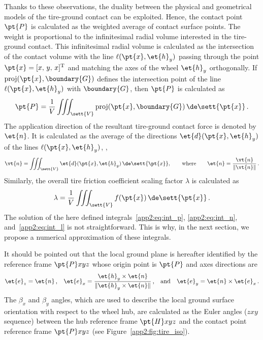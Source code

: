 Thanks to these observations, the duality between the physical and geometrical models of the tire-ground contact can be exploited. Hence, the contact point $\pt{P}$ is calculated as the weighted average of contact surface points. The weight is proportional to the infinitesimal radial volume interested in the tire-ground contact. This infinitesimal radial volume is calculated as the intersection of the contact volume with the line $\ell(\pt{x},\et{h}_y)$ passing through the point $\pt{x} = [x, \, y, \, x]^\mathrm{T}$ and matching the axes of the wheel $\et{h}_y$ orthogonally. If $\mathrm{proj}(\pt{x},\boundary{G})$ defines the intersection point of the line $\ell(\pt{x},\et{h}_y)$ with $\boundary{G}$, then $\pt{P}$ is calculated as
%
\begin{equation}
  \pt{P} = \dfrac{1}{V} \displaystyle\iiint_\sett{V} \mathrm{proj}(\pt{x},\boundary{G}) \, \de\sett{\pt{x}}
  \, \text{.}
  \label{app2:eq:int_p}
\end{equation}
%
The application direction of the resultant tire-ground contact force is denoted by $\et{n}$. It is calculated as the average of the directions $\et{d}(\pt{x},\et{h}_y)$ of the lines $\ell(\pt{x},\et{h}_y)$, \ie{},
%
\begin{equation}
  \vt{n} = \displaystyle\iiint_\sett{V} \et{d}(\pt{x},\et{h}_y) \, \de\sett{\pt{x}},
  \qquad \text{where} \qquad
  \et{n} = \dfrac{\vt{n}}{\|\vt{n}\|}
  \, \text{.}
  \label{app2:eq:int_n}
\end{equation}
%
Similarly, the overall tire friction coefficient scaling factor $\lambda$ is calculated as
%
\begin{equation}
  \lambda = \dfrac{1}{V} \displaystyle\iiint_\sett{V} f(\pt{x}) \, \de\sett{\pt{x}}
  \, \text{.}
  \label{app2:eq:int_l}
\end{equation}
%
The solution of the here defined integrals~\eqref{app2:eq:int_p}, \eqref{app2:eq:int_n}, and~\eqref{app2:eq:int_l} is not straightforward. This is why, in the next section, we propose a numerical approximation of these integrals.

It should be pointed out that the local ground plane is hereafter identified by the reference frame $\pt{P}xyz$ whose origin point is $\pt{P}$ and axes directions are
%
\begin{equation*}
  \et{e}_z = \et{n} \, \text{,} \quad
  \et{e}_x = \dfrac{\et{h}_y \times \et{n}}{\|\et{h}_y \times \et{n}\|} \, \text{,} \quad \text{and} \quad
  \et{e}_y = \et{n} \times \et{e}_x
  \, \text{.}
\end{equation*}
%
The $\beta_x$ and $\beta_y$ angles, which are used to describe the local ground surface orientation with respect to the wheel hub, are calculated as the Euler angles ($zxy$ sequence) between the hub reference frame $\pt{H}xyz$ and the contact point reference frame $\pt{P}xyz$ (see Figure~\ref{app2:fig:tire_iso}).

